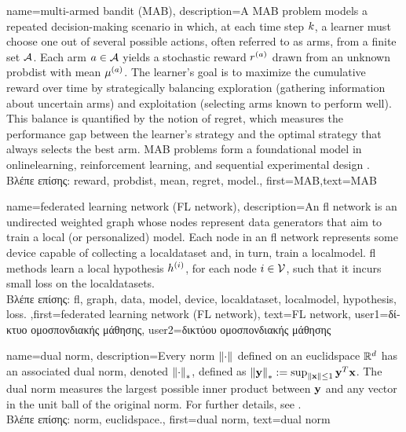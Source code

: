 {name={multi-armed bandit (MAB)},
	description={A MAB problem models 
		a repeated decision-making scenario in which, at each time step $k$, a learner must 
		choose one out of several possible actions, often referred to as arms, from a finite 
		set $\mathcal{A}$. Each arm $a \in \mathcal{A}$ yields a stochastic \gls{reward} $r^{(a)}$ 
		drawn from an unknown \gls{probdist} with \gls{mean} $\mu^{(a)}$. 
		The learner’s goal is to maximize the cumulative \gls{reward} over time by 
		strategically balancing exploration (gathering information about 
		uncertain arms) and exploitation (selecting arms known to perform well). 
		This balance is quantified by the notion of \gls{regret}, which measures the performance 
		gap between the learner's strategy and the optimal strategy that always selects the best arm. 
		MAB problems form a foundational \gls{model} in \gls{onlinelearning}, reinforcement learning, 
		and sequential experimental design \cite{Bubeck2012}.\\
		\foreignlanguage{greek}{Βλέπε επίσης:} \gls{reward}, \gls{probdist}, \gls{mean}, \gls{regret}, \gls{model}.},
	first={MAB},text={MAB}
}

{name={federated learning network (FL network)},
	description={An \gls{fl} network is an 
		undirected weighted \gls{graph} whose nodes represent \gls{data} generators that 
		aim to train a local (or personalized) \gls{model}. Each node in an \gls{fl} network 
		represents some \gls{device} capable of collecting a \gls{localdataset} 
		and, in turn, train a \gls{localmodel}. \Gls{fl} methods learn a local \gls{hypothesis} $h^{(i)}$, for 
	    each node $i \in \mathcal{V}$, such that it incurs small \gls{loss} on the \gls{localdataset}s.\\
	    \foreignlanguage{greek}{Βλέπε επίσης:} \gls{fl}, \gls{graph}, \gls{data}, \gls{model}, \gls{device}, \gls{localdataset}, \gls{localmodel}, \gls{hypothesis}, \gls{loss}.
	    },first={federated learning network (FL network)},
	    text={FL network},
	    user1={\foreignlanguage{greek}{δίκτυο ομοσπονδιακής μάθησης}}, %
  	    user2={\foreignlanguage{greek}{δικτύου ομοσπονδιακής μάθησης}} %
}

{name={dual norm},
description={Every \gls{norm} $\left\Vert {\cdot} \right\Vert_{}$ defined on an \gls{euclidspace} $\mathbb{R}^{d}$ 
		has an associated dual \gls{norm}, denoted $\left\Vert {\cdot} \right\Vert_{*}$, defined as 
		$\left\Vert {{\bf y}} \right\Vert_{*} := \sup_{\Vert {{\bf x}} \Vert{} \le 1} {\bf y}^{T} {\bf x}$. 
		The dual \gls{norm} measures the largest possible inner product between ${\bf y}$ 
		and any vector in the unit ball of the original \gls{norm}. For further details, see 
		\cite[Sec.~A.1.6]{BoydConvexBook}.\\
		\foreignlanguage{greek}{Βλέπε επίσης:} \gls{norm}, \gls{euclidspace}.},
	first={dual norm},
	text={dual norm}
}


